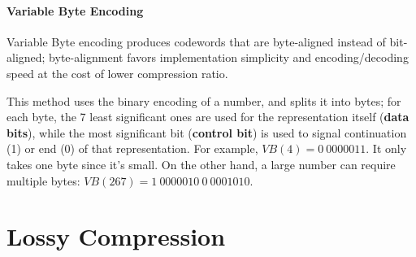 \paragraph{Variable Byte Encoding}

Variable Byte encoding produces codewords that are byte-aligned instead of bit-aligned; byte-alignment favors implementation simplicity and encoding/decoding speed at the cost of lower compression ratio. 

This method uses the binary encoding of a number, and splits it into bytes; for each byte, the 7 least significant ones are used for the representation itself (\textbf{data bits}), while the most significant bit (\textbf{control bit}) is used to signal continuation (1) or end (0) of that representation. For example, $VB(4) = 0 \ 0000011$. It only takes one byte since it's small. On the other hand, a large number can require multiple bytes: $\textit{VB}(267) = 1 \ 0000010 \ 0 \ 0001010$.

\section{Lossy Compression}